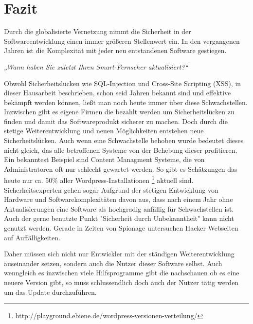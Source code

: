 \section{Fazit}
Durch die globalisierte Vernetzung nimmt die Sicherheit in der 
Softwareentwicklung einen immer größeren Stellenwert ein. In den 
vergangenen Jahren ist die Komplexität mit jeder neu entstandenen 
Software gestiegen. 
\newline

\textit{„Wann haben Sie zuletzt Ihren Smart-Fernseher aktualisiert?“} 
\begin{flushright}
Marc Rogers, US-Sicherheitsforscher}
\end{flushright} 
\newline

Obwohl Sicherheitslücken wie SQL-Injection und Cross-Site Scripting (XSS), 
in dieser Hausarbeit beschrieben, schon seid Jahren bekannt sind und 
effektive bekämpft werden können, ließt man noch heute immer über diese 
Schwachstellen. Inzwischen gibt es eigene Firmen die bezahlt werden um 
Sicherheitslücken zu finden und damit das Softwareprodukt sicherer zu 
machen. Doch durch die stetige Weiterentwicklung und neuen Möglichkeiten
entstehen neue Sicherheitslücken.
Auch wenn eine Schwachstelle behoben wurde bedeutet dieses nicht gleich, 
das alle betroffenen Systeme von der Behebung dieser profitieren.
Ein bekanntest Beispiel sind Content Managment Systeme, die von
Administratoren oft nur schlecht gewartet werden. So gibt es Schätzungen
das heute nur ca. 50\% aller Wordpress-Installationen \footnote{http://playground.ebiene.de/wordpress-versionen-verteilung/}
aktuell sind. Sicherheitsexperten gehen sogar Aufgrund der stetigen
Entwicklung von Hardware und Softwarekomplexitäten davon aus, dass 
nach einem Jahr ohne Aktualisierungen eine Software als hochgradig
anfällig für Schwachstellen ist.
Auch der gerne benutzte Punkt "Sicherheit durch Unbekanntheit" 
kann nicht genutzt werden. Gerade in Zeiten von Spionage untersuchen
Hacker Webseiten auf Auffälligkeiten.
 
Daher müssen sich nicht nur Entwickler mit der ständigen Weiterentwicklung 
auseinander setzen, sondern auch die Nutzer dieser Software selbst. 
Auch wenngleich es inzwischen viele Hilfsprogramme gibt die nachschauen 
ob es eine neuere Version gibt, so muss schlussendlich doch auch der 
Nutzer tätig werden um das Update durchzuführen.   
